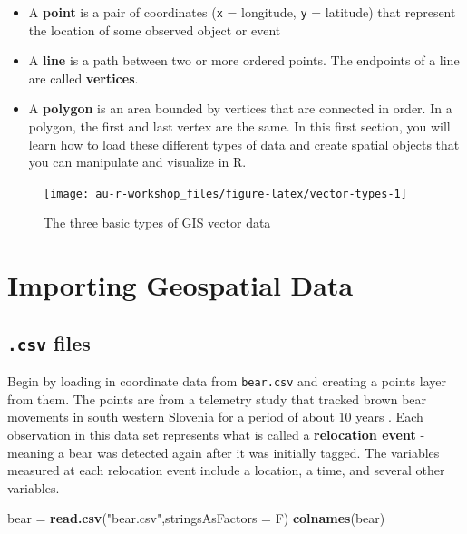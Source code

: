 \documentclass[]{book}
\newenvironment{Shaded}{\begin{snugshade}}{\end{snugshade}}
\newcommand{\KeywordTok}[1]{\textcolor[rgb]{0.13,0.29,0.53}{\textbf{#1}}}
\newcommand{\DataTypeTok}[1]{\textcolor[rgb]{0.13,0.29,0.53}{#1}}
\newcommand{\StringTok}[1]{\textcolor[rgb]{0.31,0.60,0.02}{#1}}
\newcommand{\NormalTok}[1]{#1}
\providecommand{\tightlist}{%
  \setlength{\itemsep}{0pt}\setlength{\parskip}{0pt}}
\theoremstyle{definition}
\theoremstyle{definition}
\theoremstyle{definition}
\theoremstyle{remark}
\begin{document}
\begin{itemize}
\tightlist
\item
  A \textbf{point} is a pair of coordinates (\texttt{x} = longitude,
  \texttt{y} = latitude) that represent the location of some observed
  object or event
\item
  A \textbf{line} is a path between two or more ordered points. The
  endpoints of a line are called \textbf{vertices}.
\item
  A \textbf{polygon} is an area bounded by vertices that are connected
  in order. In a polygon, the first and last vertex are the same. In
  this first section, you will learn how to load these different types
  of data and create spatial objects that you can manipulate and
  visualize in R.
\end{itemize}

\begin{figure}

{\centering \texttt{[image: au-r-workshop\_files/figure-latex/vector-types-1]} 

}

\caption{The three basic types of GIS vector data}\label{fig:vector-types}
\end{figure}

\section{Importing Geospatial Data}\label{Import}

\subsection{\texorpdfstring{\texttt{.csv}
files}{.csv files}}\label{csv-files-1}

Begin by loading in coordinate data from \texttt{bear.csv} and creating
a points layer from them. The points are from a telemetry study that
tracked brown bear movements in south western Slovenia for a period of
about 10 years \citep{bears-cite}. Each observation in this data set
represents what is called a \textbf{relocation event} - meaning a bear
was detected again after it was initially tagged. The variables measured
at each relocation event include a location, a time, and several other
variables.

\begin{Shaded}
\begin{Highlighting}[]
\NormalTok{bear =}\StringTok{ }\KeywordTok{read.csv}\NormalTok{(}\StringTok{"bear.csv"}\NormalTok{,}\DataTypeTok{stringsAsFactors =}\NormalTok{ F)}
\KeywordTok{colnames}\NormalTok{(bear)}
\end{Highlighting}
\end{Shaded}
\end{document}

